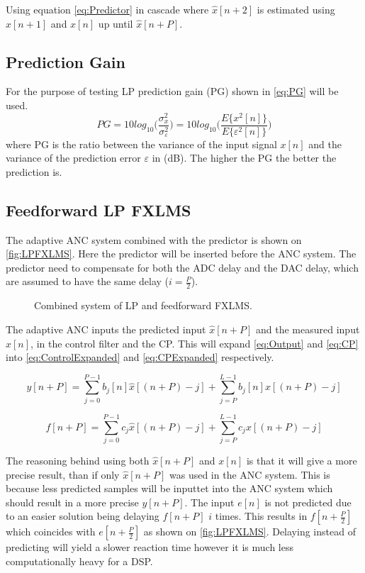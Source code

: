Using equation \ref{eq:Predictor} in cascade where $\hat{x}[n+2]$ is estimated using $\hat{x}[n+1]$ and $x[n]$ up until $\hat{x}[n+P]$. 


\subsection{Prediction Gain}
For the purpose of testing LP prediction gain (PG) shown in \autoref{eq:PG} will be used. 
\begin{equation}\label{eq:PG}
PG = 10 log_{10}\bigg(\frac{\sigma^2_x}{\sigma^2_\varepsilon}\bigg) = 10 log_{10}\bigg(\frac{E\{x^2[n]\}}{E\{\varepsilon^2[n]\}}\bigg)
\end{equation}
where PG is the ratio between the variance of the input signal $x[n]$ and the variance of the prediction error $\varepsilon$ in (dB). The higher the PG the better the prediction is.



\subsection{Feedforward LP FXLMS}
The adaptive ANC system combined with the predictor is shown on \autoref{fig:LPFXLMS}. Here the predictor will be inserted before the ANC system. The predictor need to compensate for both the ADC delay and the DAC delay, which are assumed to have the same delay ($i=\frac{P}{2}$).   

\begin{figure}[H]
	\centering
	
	\caption{Combined system of LP and feedforward FXLMS.}
	\label{fig:LPFXLMS}
\end{figure}

The adaptive ANC inputs the predicted input $\hat{x}[n+P]$ and the measured input $x[n]$, in the control filter and the CP. This will expand \autoref{eq:Output} and \autoref{eq:CP} into \autoref{eq:ControlExpanded} and \autoref{eq:CPExpanded} respectively.   

\begin{equation}\label{eq:ControlExpanded}
y[n+P]=\sum^{P-1}_{j=0}b_j[n]\hat{x}[(n+P)-j]+\sum^{L-1}_{j=P}b_j[n]x[(n+P)-j]
\end{equation}

\begin{equation}\label{eq:CPExpanded}
f[n+P]=\sum^{P-1}_{j=0}c_j\hat{x}[(n+P)-j]+\sum^{L-1}_{j=P}c_jx[(n+P)-j]
\end{equation}

The reasoning behind using both $\hat{x}[n+P]$ and $x[n]$ is that it will give a more precise result, than if only $\hat{x}[n+P]$ was used in the ANC system. This is because less predicted samples will be inputtet into the ANC system which should result in a more precise $y[n+P]$. The input $e[n]$ is not predicted due to an easier solution being delaying $f[n+P]$ $i$ times. This results in $f[n+\frac{P}{2}]$ which coincides with $e[n+\frac{P}{2}]$ as shown on \autoref{fig:LPFXLMS}. Delaying instead of predicting will yield a slower reaction time however it is much less computationally heavy for a DSP.       

